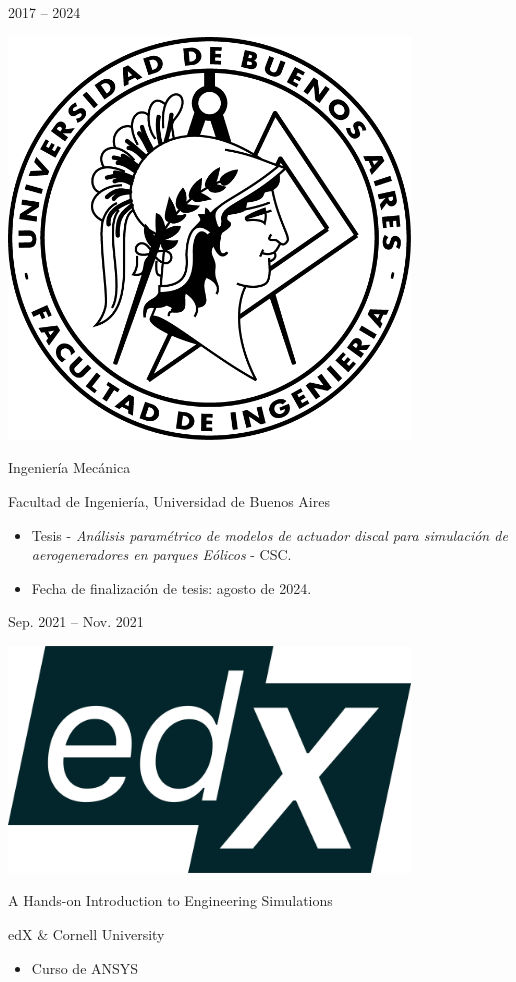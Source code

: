 \documentclass[a4paper,10pt]{article}
\newlength{\cvcolumngapwidth}
\newlength{\cvleftcolumnwidth}
\newlength{\cvrightcolumnwidth}
\newcommand{\cvtitlestyle}[1]{{\large\cvtitlefont\textcolor{cvtitlecolor}{#1}}}
\newcommand{\cvdurationstyle}[1]{{\small\cvdurationfont\textcolor{cvdurationcolor}{#1}}}
\newlength{\cvafteritemskipamount}
\newlength{\cvaftertitleskipamount}
\newlength{\cvparskip}
\newcommand{\cvitem}[2]{
    \begin{minipage}[t]{\cvleftcolumnwidth}
        \raggedleft #1
    \end{minipage}%
    \hspace{\cvcolumngapwidth}%
    \begin{minipage}[t]{\cvrightcolumnwidth}
        \setlength{\parskip}{\cvparskip} #2
    \end{minipage}

    \vspace{\cvafteritemskipamount}
}
\newcommand{\cvtitle}[1]{
    \cvtitlestyle{#1}

    \vspace{\cvaftertitleskipamount}
    \vspace{-\cvparskip}
}
\begin{document}
\cvitem{
    \cvdurationstyle{2017 -- 2024}
}{
    \begin{minipage}{0.1\textwidth}
        \centering
        \includegraphics[width=0.8\textwidth]{../logos-photos/Logo_FIUBA.png}   
    \end{minipage}      
    \cvtitle{Ingeniería Mecánica}

    Facultad de Ingeniería, Universidad de Buenos Aires
    
    \begin{itemize}[leftmargin=*]
        \item Tesis - \textit{Análisis paramétrico de modelos de actuador discal para simulación de aerogeneradores en parques Eólicos} - CSC.
        \item Fecha de finalización de tesis: agosto de 2024.
    \end{itemize}
}

\cvitem{
    \cvdurationstyle{Sep. 2021 -- Nov. 2021}
}{
    \begin{minipage}{0.1\textwidth}
        \centering
        \includegraphics[width=0.8\textwidth]{../logos-photos/Logo_edx.png}   
    \end{minipage}      
    \cvtitle{A Hands-on Introduction to Engineering Simulations}
    edX \& Cornell University

    \begin{itemize}
        \item Curso de ANSYS
    \end{itemize}
}
\end{document}
